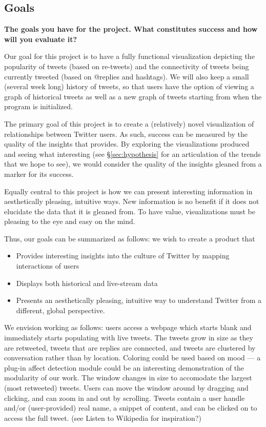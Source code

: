 \subsection{Goals}
\textbf{The goals you have for the project. What constitutes success and how will you evaluate it?}

Our goal for this project is to have a fully functional visualization depicting the popularity of tweets (based on
re-tweets) and the connectivity of tweets being currently tweeted (based on @replies and hashtags). We will also keep a
small (several week long) history of tweets, so that users have the option of viewing a graph of historical tweets as
well as a new graph of tweets starting from when the program is initialized.

The primary goal of this project is to create a (relatively) novel visualization of relationships between Twitter users.
As such, success can be measured by the quality of the insights that \sys provides. By exploring the visualizations 
produced and seeing what interesting (see \S \ref{sec:hypothesis} for an articulation of the trends that we hope to see),
we would consider the quality of the insights gleaned from \sys a marker for its success.

Equally central to this project is how we can present interesting information in aesthetically pleasing, intuitive ways.
New information is no benefit if it does not elucidate the data that it is gleaned from. To have value, visualizations
must be pleasing to the eye and easy on the mind. 

Thus, our goals can be summarized as follows: we wish to create a product that
\begin{itemize}[noitemsep]
\item Provides interesting insights into the culture of Twitter by mapping interactions of users
\item Displays both historical and live-stream data
\item Presents an aesthetically pleasing, intuitive way to understand Twitter from a different, global perspective.
\end{itemize}

We envision \sys working as follows: users access a webpage which starts blank and immediately starts populating with
live tweets. The tweets grow in size as they are retweeted, tweets that are replies are connected, and tweets are 
clustered by conversation rather than by location. Coloring could be used based on mood --- a plug-in affect detection
module could be an interesting demonstration of the modularity of our work. The window changes in size to accomodate the
largest (most retweeted) tweets. Users can move the window around by dragging and clicking, and can zoom in and out
by scrolling. Tweets contain a user handle and/or (user-provided) real name, a snippet of content, and can be clicked on
to access the full tweet. (see Listen to Wikipedia for inspiration?)

